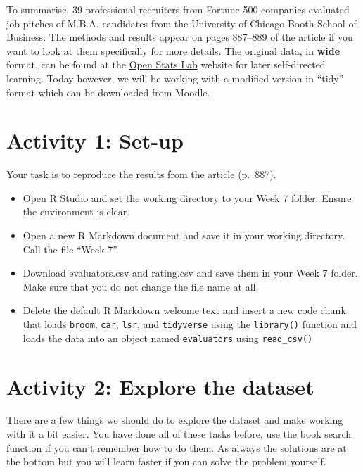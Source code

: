 \documentclass[]{book}
\providecommand{\tightlist}{%
  \setlength{\itemsep}{0pt}\setlength{\parskip}{0pt}}
\begin{document}
To summarise, 39 professional recruiters from Fortune 500 companies evaluated job pitches of M.B.A. candidates from the University of Chicago Booth School of Business. The methods and results appear on pages 887--889 of the article if you want to look at them specifically for more details. The original data, in \textbf{wide} format, can be found at the \href{https://drive.google.com/open?id=0Bz-rhZ21ShvOei1MM24xNndnQ00}{Open Stats Lab} website for later self-directed learning. Today however, we will be working with a modified version in ``tidy'' format which can be downloaded from Moodle.

\hypertarget{activity-1-set-up-7}{%
\section{Activity 1: Set-up}\label{activity-1-set-up-7}}

Your task is to reproduce the results from the article (p.~887).

\begin{itemize}
\tightlist
\item
  Open R Studio and set the working directory to your Week 7 folder. Ensure the environment is clear.\\
\item
  Open a new R Markdown document and save it in your working directory. Call the file ``Week 7''.\\
\item
  Download evaluators.csv and rating.csv and save them in your Week 7 folder. Make sure that you do not change the file name at all.\\
\item
  Delete the default R Markdown welcome text and insert a new code chunk that loads \texttt{broom}, \texttt{car}, \texttt{lsr}, and \texttt{tidyverse} using the \texttt{library()} function and loads the data into an object named \texttt{evaluators} using \texttt{read\_csv()}
\end{itemize}

\hypertarget{activity-2-explore-the-dataset}{%
\section{Activity 2: Explore the dataset}\label{activity-2-explore-the-dataset}}

There are a few things we should do to explore the dataset and make working with it a bit easier. You have done all of these tasks before, use the book search function if you can't remember how to do them. As always the solutions are at the bottom but you will learn faster if you can solve the problem yourself.
\end{document}
